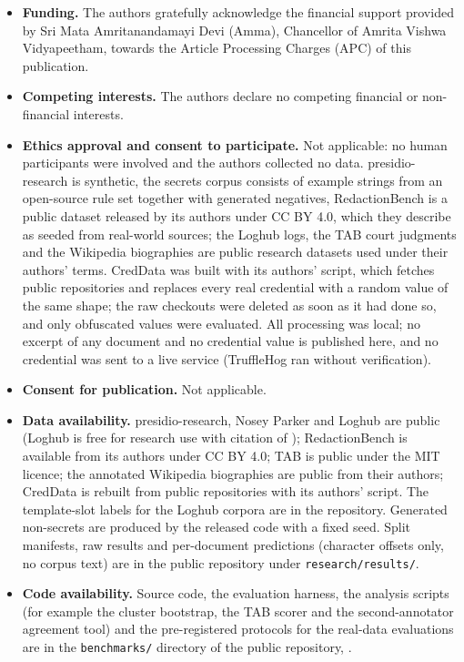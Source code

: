 \begin{itemize}
\ifanonymous\else
\item \textbf{Funding.} The authors gratefully acknowledge the financial support provided by Sri Mata Amritanandamayi Devi (Amma), Chancellor of Amrita Vishwa Vidyapeetham, towards the Article Processing Charges (APC) of this publication.
\fi
\item \textbf{Competing interests.} The authors declare no competing financial or non-financial interests.
\item \textbf{Ethics approval and consent to participate.} Not applicable: no human participants were involved and the authors collected no data. presidio-research is synthetic, the secrets corpus consists of example strings from an open-source rule set together with generated negatives, RedactionBench is a public dataset released by its authors under CC BY 4.0, which they describe as seeded from real-world sources; the Loghub logs, the TAB court judgments and the Wikipedia biographies are public research datasets used under their authors' terms. CredData was built with its authors' script, which fetches public repositories and replaces every real credential with a random value of the same shape; the raw checkouts were deleted as soon as it had done so, and only obfuscated values were evaluated. All processing was local; no excerpt of any document and no credential value is published here, and no credential was sent to a live service (TruffleHog ran without verification).
\item \textbf{Consent for publication.} Not applicable.
\item \textbf{Data availability.} presidio-research, Nosey Parker and Loghub are public (Loghub is free for research use with citation of \cite{zhu2023loghub}); RedactionBench is available from its authors under CC BY 4.0; TAB \cite{pilan2022tab} is public under the MIT licence; the annotated Wikipedia biographies \cite{papadopoulou2022bootstrapping} are public from their authors; CredData \cite{creddata2021} is rebuilt from public repositories with its authors' script. The template-slot labels for the Loghub corpora are in the repository. Generated non-secrets are produced by the released code with a fixed seed. Split manifests, raw results and per-document predictions (character offsets only, no corpus text) are in the public repository under \texttt{research/results/}.
\item \textbf{Code availability.} Source code, the evaluation harness, the analysis scripts (for example the cluster bootstrap, the TAB scorer and the second-annotator agreement tool) and the pre-registered protocols for the real-data evaluations are in the \texttt{benchmarks/} directory of the public repository, \repolink{}.

\end{itemize}
